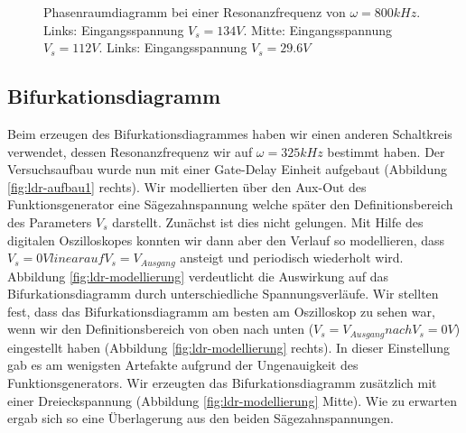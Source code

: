 \documentclass[11,5pt, twoside]{article}
\begin{document}
\begin{figure}[!htbp]
\caption{Phasenraumdiagramm bei einer Resonanzfrequenz von $\omega=800kHz$. Links: Eingangsspannung $V_s=134V$. Mitte: Eingangsspannung $V_s=112V$. Links: Eingangsspannung $V_s=29.6V$}
\label{fig:ldr-real2}
\end{figure}
\subsection { Bifurkationsdiagramm }
Beim erzeugen des Bifurkationsdiagrammes haben wir einen anderen Schaltkreis verwendet, dessen Resonanzfrequenz wir auf $\omega=325kHz$ bestimmt haben. Der Versuchsaufbau wurde nun mit einer Gate-Delay Einheit aufgebaut (Abbildung \ref{fig:ldr-aufbau1} rechts). Wir modellierten über den Aux-Out des Funktionsgenerator eine Sägezahnspannung welche später den Definitionsbereich des Parameters $V_s$ darstellt. 
Zunächst ist dies nicht gelungen. Mit Hilfe des digitalen Oszilloskopes konnten wir dann aber den Verlauf so modellieren, dass  $V_s=0V linear auf V_s=V_{Ausgang}$ ansteigt und periodisch wiederholt wird.
Abbildung \ref{fig:ldr-modellierung} verdeutlicht die Auswirkung auf das Bifurkationsdiagramm durch unterschiedliche Spannungsverläufe.
Wir stellten fest, dass das Bifurkationsdiagramm am besten am Oszilloskop zu sehen war, wenn wir den Definitionsbereich von oben nach unten ($V_s=V_{Ausgang} nach V_s=0V$) eingestellt haben (Abbildung \ref{fig:ldr-modellierung} rechts). In dieser Einstellung gab es am wenigsten Artefakte aufgrund der Ungenauigkeit des Funktionsgenerators. Wir erzeugten das Bifurkationsdiagramm zusätzlich mit einer Dreieckspannung (Abbildung \ref{fig:ldr-modellierung} Mitte). Wie zu erwarten ergab sich so eine Überlagerung aus den beiden Sägezahnspannungen. 
\end{document}
